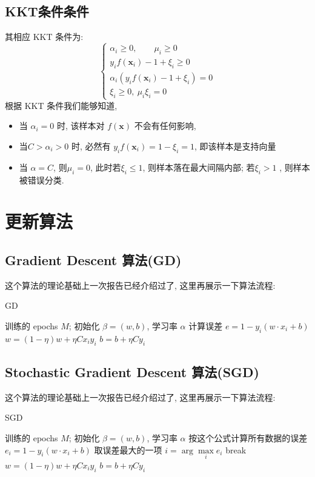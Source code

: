 \documentclass[UTF8]{article}
\begin{document}
\subsection{KKT条件条件}
\noindent 其相应 KKT 条件为:
$$\left\{\begin{array}{l}
	\alpha_i\ge0,\qquad\mu_i\ge0\\
	y_if(\bm{x}_i)-1+\xi_i\ge0\\
	\alpha_i(y_if(\bm{x}_i)-1+\xi_i)=0\\
	\xi_i\ge 0,\ \mu_i\xi_i=0
\end{array}\right.$$
根据 KKT 条件我们能够知道, 
\begin{itemize}
	\item 当 $\alpha_i=0$ 时, 该样本对 $f(\bm{x})$ 不会有任何影响,
	\item 当$C>\alpha_i>0$ 时, 必然有 $y_if(\bm{x}_i)=1-\xi_i=1$, 即该样本是支持向量
	\item 当 $\alpha=C$, 则$\mu_i=0$, 此时若$\xi_i\le1$, 则样本落在最大间隔内部; 若$\xi_i>1$ , 则样本被错误分类.
\end{itemize}
\section{更新算法}
\subsection{Gradient Descent 算法(GD)}
\noindent 这个算法的理论基础上一次报告已经介绍过了, 这里再展示一下算法流程:
\begin{algorithm}[H]
	\caption{GD}
	\begin{algorithmic}[1] %
		\Require 训练的 epochs $M$; 初始化 $\beta=(w,b)$, 学习率 $\alpha$
				\State 计算误差 $e=1-y_i(w\cdot x_i+b)$
					\State $w=(1-\eta)w+\eta Cx_iy_i$
					\State $b=b+\eta Cy_i$
				\EndIf
			\EndFor
		\EndFor
	\end{algorithmic}
\end{algorithm}

\subsection{Stochastic Gradient Descent 算法(SGD)}
\noindent 这个算法的理论基础上一次报告已经介绍过了, 这里再展示一下算法流程:
\begin{algorithm}[H]
	\caption{SGD}
	\begin{algorithmic}[1] %
		\Require 训练的 epochs $M$; 初始化 $\beta=(w,b)$, 学习率 $\alpha$
				\State 按这个公式计算所有数据的误差 $e_i=1-y_i(w\cdot x_i+b)$
				\State 取误差最大的一项 $i=\arg\max\limits_ie_i$
					\State break
				\EndIf
				\State $w=(1-\eta)w+\eta Cx_iy_i$
				\State $b=b+\eta Cy_i$
			\EndFor
		\EndFor
	\end{algorithmic}
\end{algorithm}
\end{document}
